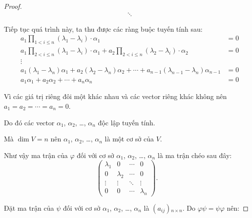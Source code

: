 \documentclass[class=linearalgebra,crop=false]{standalone}
\begin{document}
\begin{proof}
\begin{align*}
                         & \ddots
    \end{align*}
    \par Tiếp tục quá trình này, ta thu được các ràng buộc tuyến tính sau:
    \begin{align*}
         & a_{1}\prod_{1 < i \le n}(\lambda_{1} - \lambda_{i})\cdot\alpha_{1}                                                                                  & = 0 \\
         & a_{1}\prod_{2 < i \le n}(\lambda_{1} - \lambda_{i})\cdot\alpha_{1} + a_{2}\prod_{2 < i\le n}(\lambda_{2} - \lambda_{i})\cdot\alpha_{2}              & = 0 \\
         & \vdots                                                                                                                                                    \\
         & a_{1}(\lambda_{1} - \lambda_{n})\alpha_{1} + a_{2}(\lambda_{2} - \lambda_{n})\alpha_{2} + \cdots + a_{n-1}(\lambda_{n-1} - \lambda_{n})\alpha_{n-1} & = 0 \\
         & a_{1}\alpha_{1} + a_{2}\alpha_{2} + \cdots + a_{n}\alpha_{n}                                                                                        & = 0
    \end{align*}
    \par Vì các giá trị riêng đôi một khác nhau và các vector riêng khác không nên $a_{1} = a_{2} = \cdots = a_{n} = 0$.
    \par Do đó các vector $\alpha_{1}$, $\alpha_{2}$, \ldots, $\alpha_{n}$ độc lập tuyến tính.
    \par Mà $\dim V = n$ nên $\alpha_{1}$, $\alpha_{2}$, \ldots, $\alpha_{n}$ là một cơ sở của $V$.
    \par Như vậy ma trận của $\varphi$ đối với cơ sở $\alpha_{1}$, $\alpha_{2}$, \ldots, $\alpha_{n}$ là ma trận chéo sau đây:
    \[
        \begin{pmatrix}
            \lambda_{1} & 0           & \cdots & 0           \\
            0           & \lambda_{2} & \cdots & 0           \\
            \vdots      & \vdots      & \ddots & \vdots      \\
            0           & 0           & \cdots & \lambda_{n}
        \end{pmatrix}.
    \]
    \par Đặt ma trận của $\psi$ đối với cơ sở $\alpha_{1}$, $\alpha_{2}$, \ldots, $\alpha_{n}$ là $(a_{ij}){}_{n\times n}$. Do $\varphi\psi = \psi\varphi$ nên:

\end{proof}
\end{document}
